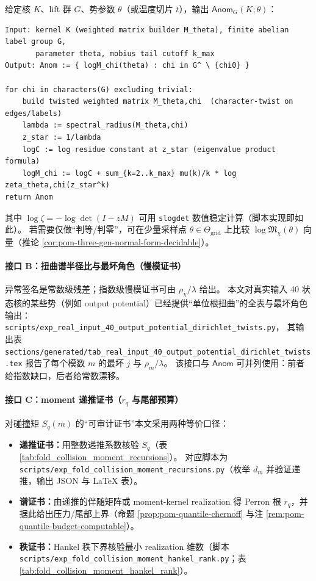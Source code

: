 \begin{remark}\label{rem:pom-anom-pseudocode}
给定核 \(K\)、lift 群 \(G\)、势参数 \(\theta\)（或温度切片 \(t\)），输出 \(\mathsf{Anom}_G(K;\theta)\)：
\begin{verbatim}
Input: kernel K (weighted matrix builder M_theta), finite abelian label group G,
       parameter theta, mobius tail cutoff k_max
Output: Anom := { logM_chi(theta) : chi in G^ \ {chi0} }

for chi in characters(G) excluding trivial:
    build twisted weighted matrix M_theta,chi  (character-twist on edges/labels)
    lambda := spectral_radius(M_theta,chi)
    z_star := 1/lambda
    logC := log residue constant at z_star (eigenvalue product formula)
    logM_chi := logC + sum_{k=2..k_max} mu(k)/k * log zeta_theta,chi(z_star^k)
return Anom
\end{verbatim}
其中 \(\log\zeta=-\log\det(I-zM)\) 可用 \texttt{slogdet} 数值稳定计算（脚本实现即如此）。
若需要仅做“判等/判零”，可在少量采样点 \(\theta\in\Theta_{\mathrm{grid}}\) 上比较 \(\log\mathfrak{M}_\chi(\theta)\) 向量（推论 \ref{cor:pom-three-gen-normal-form-decidable}）。
\end{remark}

\paragraph{接口 B：扭曲谱半径比与最坏角色（慢模证书）}
异常签名是常数级残差；指数级慢模证书可由 \(\rho_\chi/\lambda\) 给出。
本文对真实输入 40 状态核的某些势（例如 output potential）已经提供“单位根扭曲”的全表与最坏角色输出：
\texttt{scripts/exp\_real\_input\_40\_output\_potential\_dirichlet\_twists.py}，
其输出表 \texttt{sections/generated/tab\_real\_input\_40\_output\_potential\_dirichlet\_twists.tex}
报告了每个模数 \(m\) 的最坏 \(j\) 与 \(\rho_m/\lambda\)。
该接口与 \(\mathsf{Anom}\) 可并列使用：前者给指数缺口，后者给常数漂移。

\paragraph{接口 C：moment 递推证书（\texorpdfstring{$r_q$}{rq} 与尾部预算）}
对碰撞矩 \(S_q(m)\) 的“可审计证书”本文采用两种等价口径：
\begin{itemize}
  \item \textbf{递推证书：}用整数递推系数核验 \(S_q\)（表 \ref{tab:fold_collision_moment_recursions}）。
  对应脚本为 \texttt{scripts/exp\_fold\_collision\_moment\_recursions.py}（枚举 \(d_m\) 并验证递推，输出 JSON 与 LaTeX 表）。
  \item \textbf{谱证书：}由递推的伴随矩阵或 moment-kernel realization 得 Perron 根 \(r_q\)，并据此给出压力/尾部上界（命题 \ref{prop:pom-quantile-chernoff} 与注 \ref{rem:pom-quantile-budget-computable}）。
  \item \textbf{秩证书：}Hankel 秩下界核验最小 realization 维数（脚本 \texttt{scripts/exp\_fold\_collision\_moment\_hankel\_rank.py}；表 \ref{tab:fold_collision_moment_hankel_rank}）。
  \end{itemize}

